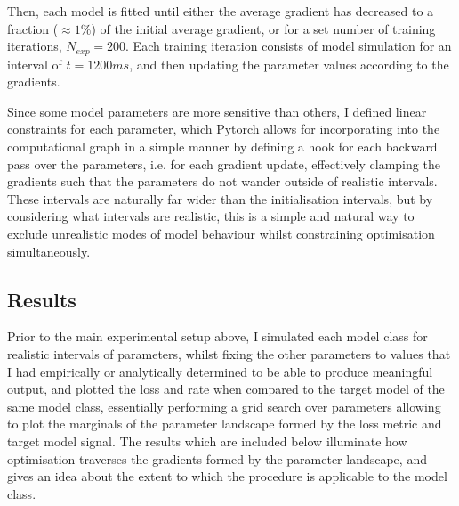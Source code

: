 \documentclass[mphil,deptreport,ai]{infthesis} %
\begin{document}
Then, each model is fitted until either the average gradient has decreased to a fraction ($\approx 1 \%$) of the initial average gradient, or for a set number of training iterations, $N_{exp}=200$.
Each training iteration consists of model simulation for an interval of $t=1200 \si{ms}$, and then updating the parameter values according to the gradients.

Since some model parameters are more sensitive than others, I defined linear constraints for each parameter, which Pytorch allows for incorporating into the computational graph in a simple manner by defining a hook for each backward pass over the parameters, i.e. for each gradient update, effectively clamping the gradients such that the parameters do not wander outside of realistic intervals. These intervals are naturally far wider than the initialisation intervals, but by considering what intervals are realistic, this is a simple and natural way to exclude unrealistic modes of model behaviour whilst constraining optimisation simultaneously.


\subsection{Results}

Prior to the main experimental setup above, I simulated each model class for realistic intervals of parameters, whilst fixing the other parameters to values that I had empirically or analytically determined to be able to produce meaningful output, and plotted the loss and rate when compared to the target model of the same model class, essentially performing a grid search over parameters allowing to plot the marginals of the parameter landscape formed by the loss metric and target model signal.
The results which are included below illuminate how optimisation traverses the gradients formed by the parameter landscape, and gives an idea about the extent to which the procedure is applicable to the model class.



\end{document}
